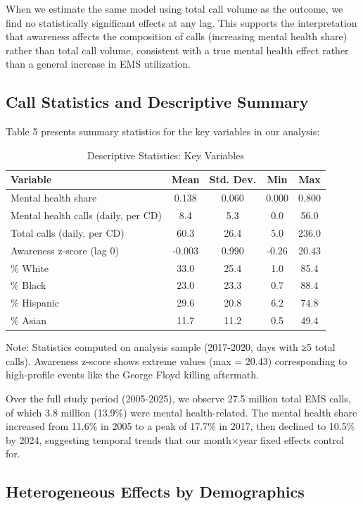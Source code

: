 \documentclass[11pt,a4paper]{article}
\begin{document}
When we estimate the same model using total call volume as the outcome, we find no statistically significant effects at any lag. This supports the interpretation that awareness affects the composition of calls (increasing mental health share) rather than total call volume, consistent with a true mental health effect rather than a general increase in EMS utilization.

\subsection{Call Statistics and Descriptive Summary}

Table 5 presents summary statistics for the key variables in our analysis:

\begin{table}[H]
\centering
\caption{Descriptive Statistics: Key Variables}
\label{tab:descriptive}
\begin{tabular}{lcccc}
\toprule
Variable & Mean & Std. Dev. & Min & Max \\
\midrule
Mental health share & 0.138 & 0.060 & 0.000 & 0.800 \\
Mental health calls (daily, per CD) & 8.4 & 5.3 & 0.0 & 56.0 \\
Total calls (daily, per CD) & 60.3 & 26.4 & 5.0 & 236.0 \\
Awareness z-score (lag 0) & -0.003 & 0.990 & -0.26 & 20.43 \\
\% White & 33.0 & 25.4 & 1.0 & 85.4 \\
\% Black & 23.0 & 23.3 & 0.7 & 88.4 \\
\% Hispanic & 29.6 & 20.8 & 6.2 & 74.8 \\
\% Asian & 11.7 & 11.2 & 0.5 & 49.4 \\
\bottomrule
\end{tabular}
\footnotesize
Note: Statistics computed on analysis sample (2017-2020, days with ≥5 total calls). Awareness z-score shows extreme values (max = 20.43) corresponding to high-profile events like the George Floyd killing aftermath.
\end{table}

Over the full study period (2005-2025), we observe 27.5 million total EMS calls, of which 3.8 million (13.9\%) were mental health-related. The mental health share increased from 11.6\% in 2005 to a peak of 17.7\% in 2017, then declined to 10.5\% by 2024, suggesting temporal trends that our month×year fixed effects control for.

\subsection{Heterogeneous Effects by Demographics}
\end{document}
